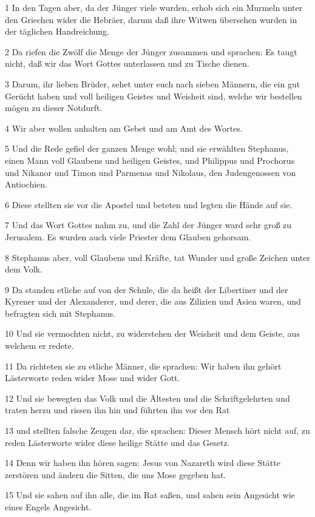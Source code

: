 \par 1 In den Tagen aber, da der Jünger viele wurden, erhob sich ein Murmeln unter den Griechen wider die Hebräer, darum daß ihre Witwen übersehen wurden in der täglichen Handreichung.
\par 2 Da riefen die Zwölf die Menge der Jünger zusammen und sprachen: Es taugt nicht, daß wir das Wort Gottes unterlassen und zu Tische dienen.
\par 3 Darum, ihr lieben Brüder, sehet unter euch nach sieben Männern, die ein gut Gerücht haben und voll heiligen Geistes und Weisheit sind, welche wir bestellen mögen zu dieser Notdurft.
\par 4 Wir aber wollen anhalten am Gebet und am Amt des Wortes.
\par 5 Und die Rede gefiel der ganzen Menge wohl; und sie erwählten Stephanus, einen Mann voll Glaubens und heiligen Geistes, und Philippus und Prochorus und Nikanor und Timon und Parmenas und Nikolaus, den Judengenossen von Antiochien.
\par 6 Diese stellten sie vor die Apostel und beteten und legten die Hände auf sie.
\par 7 Und das Wort Gottes nahm zu, und die Zahl der Jünger ward sehr groß zu Jerusalem. Es wurden auch viele Priester dem Glauben gehorsam.
\par 8 Stephanus aber, voll Glaubens und Kräfte, tat Wunder und große Zeichen unter dem Volk.
\par 9 Da standen etliche auf von der Schule, die da heißt der Libertiner und der Kyrener und der Alexanderer, und derer, die aus Zilizien und Asien waren, und befragten sich mit Stephanus.
\par 10 Und sie vermochten nicht, zu widerstehen der Weisheit und dem Geiste, aus welchem er redete.
\par 11 Da richteten sie zu etliche Männer, die sprachen: Wir haben ihn gehört Lästerworte reden wider Mose und wider Gott.
\par 12 Und sie bewegten das Volk und die Ältesten und die Schriftgelehrten und traten herzu und rissen ihn hin und führten ihn vor den Rat
\par 13 und stellten falsche Zeugen dar, die sprachen: Dieser Mensch hört nicht auf, zu reden Lästerworte wider diese heilige Stätte und das Gesetz.
\par 14 Denn wir haben ihn hören sagen: Jesus von Nazareth wird diese Stätte zerstören und ändern die Sitten, die uns Mose gegeben hat.
\par 15 Und sie sahen auf ihn alle, die im Rat saßen, und sahen sein Angesicht wie eines Engels Angesicht.

